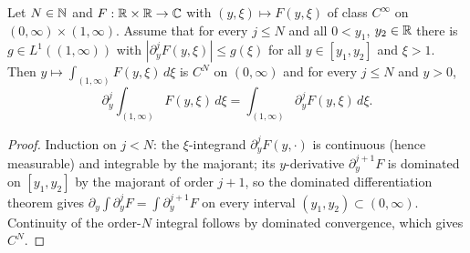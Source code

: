\begin{lemma}
  \label{lem:c03_far_param_integral}
  Let $N\in\mathbb{N}$ and $F:\mathbb{R}\times\mathbb{R}\to\mathbb{C}$ with $(y,\xi)\mapsto F(y,\xi)$ of class $C^\infty$ on
  $(0,\infty)\times(1,\infty)$. Assume that for every $j\le N$ and all $0<y_1$, $y_2\in\mathbb{R}$ there is
  $g\in L^1((1,\infty))$ with $|\partial_y^jF(y,\xi)|\le g(\xi)$ for all $y\in[y_1,y_2]$ and $\xi>1$.
  Then $y\mapsto\int_{(1,\infty)}F(y,\xi)\,d\xi$ is $C^N$ on $(0,\infty)$ and for every $j\le N$ and $y>0$,
  \[
    \partial_y^j\int_{(1,\infty)}F(y,\xi)\,d\xi=\int_{(1,\infty)}\partial_y^jF(y,\xi)\,d\xi .
  \]
\end{lemma}
\begin{proof}
  Induction on $j<N$: the $\xi$-integrand $\partial_y^jF(y,\cdot)$ is continuous (hence measurable) and
  integrable by the majorant; its $y$-derivative $\partial_y^{j+1}F$ is dominated on $[y_1,y_2]$ by the
  majorant of order $j+1$, so the dominated differentiation theorem gives
  $\partial_y\int\partial_y^jF=\int\partial_y^{j+1}F$ on every interval $(y_1,y_2)\subset(0,\infty)$.
  Continuity of the order-$N$ integral follows by dominated convergence, which gives $C^N$.
\end{proof}

